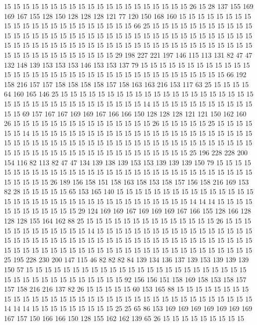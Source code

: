15 15 15 15 15 15 15 15 15 15 15 15 15 15 15 15 15 15 15 15
26 15 28 137 155 169 169 167 155 128 150 128 128 128 121 77 120 150 168 160
15 15 15 15 15 15 15 15 15 15 15 15 15 15 15 15 15 15 15 15
15 15 66 25 15 15 15 15 15 15 15 15 15 15 15 15 15 15 15 15
15 15 15 15 15 15 15 15 15 15 15 15 15 15 15 15 15 15 15 15
15 15 15 15 15 15 15 15 15 15 15 15 15 15 15 15 15 15 15 15
15 15 15 15 15 15 15 15 15 15 15 15 15 15 15 15 15 15 15 15
15 29 198 227 221 197 146 115 113 131 82 47 47 132 148 139 153 153 153 146
153 153 137 79 15 15 15 15 15 15 15 15 15 15 15 15 15 15 15 15
15 15 15 15 15 15 15 15 15 15 15 15 15 15 15 15 15 15 15 15
66 192 158 216 157 157 158 158 158 158 157 158 163 163 216 153 117 63 25 15
15 15 15 64 160 165 146 25 15 15 15 15 15 15 15 15 15 15 15 15
15 15 15 15 15 15 15 15 15 15 15 15 15 15 15 15 15 15 15 15
15 15 15 15 14 15 15 15 15 15 15 15 15 15 15 15 15 15 69 157
167 167 169 169 167 166 166 150 128 128 128 121 121 150 162 160 26 15 15 15
15 15 15 15 15 15 15 15 15 15 15 15 26 15 15 15 15 15 25 15
15 15 15 15 15 14 15 15 15 15 15 15 15 15 15 15 15 15 15 15
15 15 15 15 15 15 15 15 15 15 15 15 15 15 15 15 15 15 15 15
15 15 15 15 15 15 15 15 15 15 15 15 15 15 15 15 15 15 15 15
15 15 15 15 15 15 15 15 15 15 15 15 15 15 15 15 15 25 196 228
228 200 154 116 82 113 82 47 47 134 139 138 139 153 153 139 139 139 150 79
15 15 15 15 15 15 15 15 15 15 15 15 15 15 15 15 15 15 15 15
15 15 15 15 15 15 15 15 15 15 15 15 15 15 15 15 26 189 156 158
151 158 163 158 153 158 157 156 158 216 169 153 82 28 15 15 15 15 15 65
153 165 140 15 15 15 15 15 15 15 15 15 15 15 15 15 15 15 15 15
15 15 15 15 15 15 15 15 15 15 15 15 15 15 15 15 15 15 14 14
14 15 15 15 15 15 15 15 15 15 15 15 15 29 124 169 169 167 169 169
169 167 166 155 128 166 128 128 128 155 164 162 88 25 15 15 15 15 15 15
15 15 15 15 15 15 15 15 26 15 15 15 15 15 15 15 15 15 15 15
15 14 15 15 15 15 15 15 15 15 15 15 15 15 15 15 15 15 15 15
15 15 15 15 15 15 15 15 15 15 15 15 15 15 15 15 15 15 15 15
15 15 15 15 15 15 15 15 15 15 15 15 15 15 15 15 15 15 15 15
15 15 15 15 15 15 15 15 15 15 15 15 15 25 195 228 230 200 147 115
46 82 82 82 84 139 134 136 137 139 153 139 139 139 150 57 15 15 15 15
15 15 15 15 15 15 15 15 15 15 15 15 15 15 15 15 15 15 15 15
15 15 15 15 15 15 15 15 15 15 15 15 15 92 156 156 151 158 169 158
153 158 157 157 158 216 216 137 82 26 15 15 15 15 15 60 153 165 88 15
15 15 15 15 15 15 15 15 15 15 15 15 15 15 15 15 15 15 15 15
15 15 15 15 15 15 15 15 15 15 15 15 15 15 14 14 14 15 15 15
15 15 15 15 15 15 25 25 65 86 153 169 169 169 169 169 169 169 167 157
150 166 166 150 128 155 162 162 139 65 26 15 15 15 15 15 15 15 15 15
